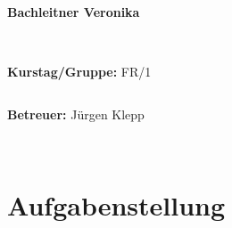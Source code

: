 \documentclass[12pt,a4paper,twopage]{article}
\begin{document}
\begin{verbatim}
\end{verbatim}
		\begin{flushleft}
			\textbf{\Large{Bachleitner Veronika}} 
			\end{flushleft}

\begin{verbatim}


\end{verbatim}
			\begin{flushleft}
			\textbf{\Large{Kurstag/Gruppe:}} \Large{FR/1}
			\end{flushleft}

\begin{verbatim}

\end{verbatim}
			\begin{flushleft}
			\textbf{\Large{Betreuer:}} \Large{Jürgen Klepp}		
			\end{flushleft}
\newpage
\begin{verbatim}


\end{verbatim}
			
\section{Aufgabenstellung}
\end{document}
